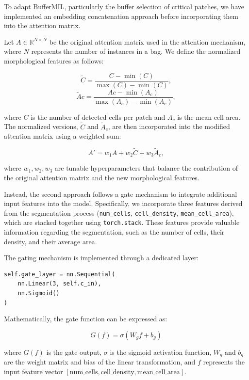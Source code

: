 \documentclass[10pt,twocolumn]{article}
\begin{document}
To adapt BufferMIL, particularly the buffer selection of critical patches, we have implemented an embedding concatenation approach before incorporating them into the attention matrix. 

Let $A \in \mathbb{R}^{N \times N}$ be the original attention matrix used in the attention mechanism, where $N$ represents the number of instances in a bag. We define the normalized morphological features as follows:

\begin{equation}
\tilde{C} = \frac{C - \min(C)}{\max(C) - \min(C)},
\end{equation}
\begin{equation}
\tilde{A}{c} = \frac{A{c} - \min(A_{c})}{\max(A_{c}) - \min(A_{c})},
\end{equation}

where $C$ is the number of detected cells per patch and $A_{c}$ is the mean cell area. The normalized versions, $\tilde{C}$ and $\tilde{A}_{c}$, are then incorporated into the modified attention matrix using a weighted sum:

\begin{equation}
A' = w_1 A + w_2 \tilde{C} + w_3 \tilde{A}_{c},
\end{equation}

where $w_1, w_2, w_3$ are tunable hyperparameters that balance the contribution of the original attention matrix and the new morphological features.


Instead, the second approach follows a gate mechanism to integrate additional input features into the model. Specifically, we incorporate three features derived from the segmentation process (\texttt{num\_cells}, \texttt{cell\_density}, \texttt{mean\_cell\_area}), which are stacked together using \texttt{torch.stack}. These features provide valuable information regarding the segmentation, such as the number of cells, their density, and their average area.

The gating mechanism is implemented through a dedicated layer:

\begin{verbatim}
self.gate_layer = nn.Sequential(
    nn.Linear(3, self.c_in),
    nn.Sigmoid()
)
\end{verbatim}

Mathematically, the gate function can be expressed as:

\[
G(f) = \sigma(W_g f + b_g)
\]

where \( G(f) \) is the gate output, \( \sigma \) is the sigmoid activation function, \( W_g \) and \( b_g \) are the weight matrix and bias of the linear transformation, and \( f \) represents the input feature vector \([\text{num\_cells}, \text{cell\_density}, \text{mean\_cell\_area}]\).
\end{document}
